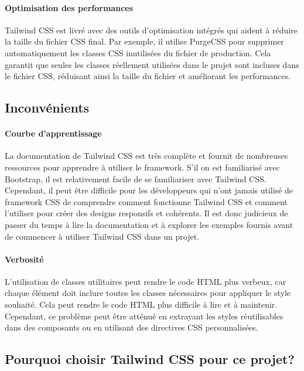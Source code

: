 \paragraph{Optimisation des performances}

Tailwind CSS est livré avec des outils d'optimisation intégrés qui aident à réduire la taille du fichier CSS final. Par exemple, il utilise PurgeCSS pour supprimer automatiquement les classes CSS inutilisées du fichier de production. Cela garantit que seules les classes réellement utilisées dans le projet sont incluses dans le fichier CSS, réduisant ainsi la taille du fichier et améliorant les performances.

\subsection{Inconvénients}

\paragraph{Courbe d'apprentissage}

La documentation de Tailwind CSS est très complète et fournit de nombreuses ressources pour apprendre à utiliser le framework. S'il on est familiarisé avec Bootstrap, il est relativement facile de se familiariser avec Tailwind CSS. Cependant, il peut être difficile pour les développeurs qui n'ont jamais utilisé de framework CSS de comprendre comment fonctionne Tailwind CSS et comment l'utiliser pour créer des designs responsifs et cohérents. Il est donc judicieux de passer du temps à lire la documentation et à explorer les exemples fournis avant de commencer à utiliser Tailwind CSS dans un projet.

\paragraph{Verbosité}

L'utilisation de classes utilitaires peut rendre le code HTML plus verbeux, car chaque élément doit inclure toutes les classes nécessaires pour appliquer le style souhaité. Cela peut rendre le code HTML plus difficile à lire et à maintenir. Cependant, ce problème peut être atténué en extrayant les styles réutilisables dans des composants ou en utilisant des directives CSS personnalisées.

\subsection{Pourquoi choisir Tailwind CSS pour ce projet?}

